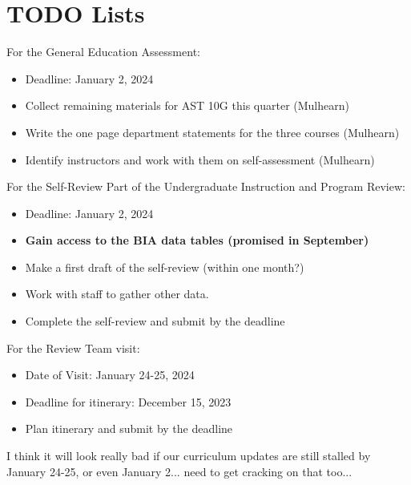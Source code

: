 \documentclass[12pt]{article}
\begin{document}
\section{TODO Lists}

\noindent
For the General Education Assessment:
\begin{itemize}
\item Deadline:  January 2, 2024
\item Collect remaining materials for AST 10G this quarter (Mulhearn)
\item Write the one page department statements for the three courses (Mulhearn)
\item Identify instructors and work with them on self-assessment (Mulhearn)
\end{itemize}

\noindent
For the Self-Review Part of the Undergraduate Instruction and Program Review:
\begin{itemize}
\item Deadline:  January 2, 2024  
\item {\bf Gain access to the BIA data tables (promised in September)}
\item Make a first draft of the self-review (within one month?)
\item Work with staff to gather other data.
\item Complete the self-review and submit by the deadline
\end{itemize}

\noindent
For the Review Team visit:
\begin{itemize}
\item Date of Visit: January 24-25, 2024
\item Deadline for itinerary:  December 15, 2023  
\item Plan itinerary and submit by the deadline
\end{itemize}

I think it will look really bad if our curriculum updates are still stalled by January 24-25, or even January 2... need to get cracking on that too...
\end{document}
